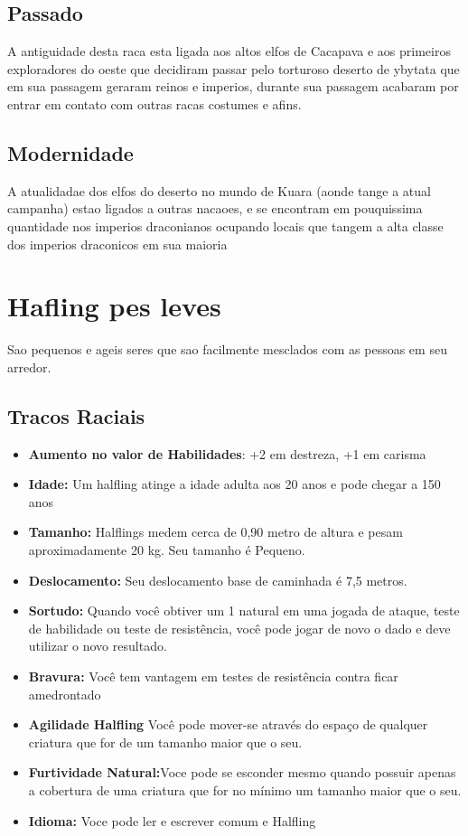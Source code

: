 \documentclass{book}
\begin{document}
\section{Passado}
A antiguidade desta raca esta ligada aos altos elfos de Cacapava e aos primeiros exploradores 
do oeste que decidiram passar pelo torturoso deserto de ybytata que em sua passagem 
geraram reinos e imperios, durante sua passagem acabaram por entrar em contato com outras 
racas costumes e afins.
\section{Modernidade}
A atualidadae dos elfos do deserto no mundo de Kuara (aonde tange a atual campanha) estao 
ligados a outras nacaoes, e se encontram em pouquissima quantidade nos imperios draconianos 
ocupando locais que tangem a alta classe dos imperios draconicos em sua maioria 


\chapter{Hafling pes leves}
    Sao pequenos e ageis seres que sao facilmente mesclados com as pessoas em seu arredor.
\section{Tracos Raciais}
\begin{itemize}
    \item \textbf{Aumento no valor de Habilidades}: +2 em destreza, +1 em carisma
    \item \textbf{Idade:} Um halfling atinge a idade adulta aos 20 anos e pode chegar a 150    
          anos
    \item \textbf{Tamanho:} Halflings medem cerca de 0,90 metro de altura e pesam 
          aproximadamente 20 kg. Seu tamanho é Pequeno.
    \item \textbf{Deslocamento:} Seu deslocamento base de caminhada é 7,5 metros.
    \item \textbf{Sortudo:} Quando você obtiver um 1 natural em uma jogada de ataque, teste 
          de habilidade ou teste de resistência, você pode jogar de novo o dado e deve 
          utilizar o novo resultado.
    \item \textbf{Bravura:} Você tem vantagem em testes de resistência contra ficar amedrontado
    \item \textbf{Agilidade Halfling} Você pode mover-se através do espaço de qualquer 
          criatura que for de um tamanho maior que o seu.
    \item \textbf{Furtividade Natural:}Voce pode se esconder mesmo quando possuir apenas a 
          cobertura de uma criatura que for no mínimo um tamanho maior que o seu.
    \item \textbf{Idioma:} Voce pode ler e escrever comum e Halfling
\end{itemize} 
\end{document}

